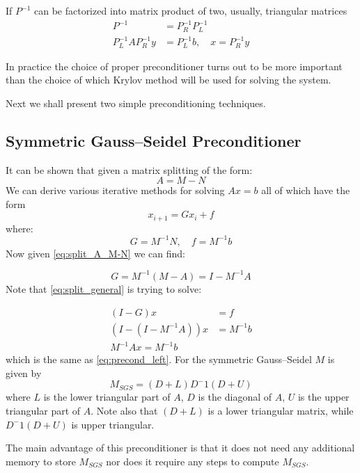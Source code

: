 If $P^{-1}$ can be factorized into matrix product of two, usually, triangular matrices
\begin{align}
	P^{-1} &= P_R^{-1}P_L^{-1} \\
	P_L^{-1}AP_R^{-1}y &= P_L^{-1}b, \quad x = P_R^{-1}y
\end{align}

In practice the choice of proper preconditioner turns out to be more important than the choice of which Krylov method will be used for solving the system.

Next we shall present two simple preconditioning techniques.

\subsection{Symmetric Gauss--Seidel Preconditioner}
It can be shown \cite{saad-sparse} that given a matrix splitting of the form:
\begin{equation}\label{eq:split_A_M-N}
	A = M - N
\end{equation}
We can derive various iterative methods for solving $Ax = b$ all of which have the form
\begin{equation}\label{eq:split_general}
	x_{i+1} = Gx_i + f
\end{equation}
where:
\begin{equation}
	G = M^{-1}N, \quad f = M^{-1}b
\end{equation}
Now given \cref{eq:split_A_M-N} we can find:

\begin{equation}
	G = M^{-1}(M - A) = I - M^{-1}A
\end{equation}
Note that \cref{eq:split_general} is trying to solve:

\begin{align}
	(I - G)x &= f \\
	(I - (I - M^{-1}A))x &= M^{-1}b \\
	M^{-1}Ax = M^{-1}b
\end{align}
which is the same as \cref{eq:precond_left}. For the symmetric Gauss--Seidel $M$ is given by
\begin{equation}\label{eq:SGS_precond}
	M_{SGS} = (D + L)D^-1(D + U)
\end{equation}
where $L$ is the lower triangular part of $A$, $D$ is the diagonal of $A$, $U$ is the upper triangular part of $A$. Note also that $(D + L)$ is a lower triangular matrix, while $D^-1(D + U)$ is upper triangular.

The main advantage of this preconditioner is that it does not need any additional memory to store $M_{SGS}$ nor does it require any steps to compute $M_{SGS}$.

